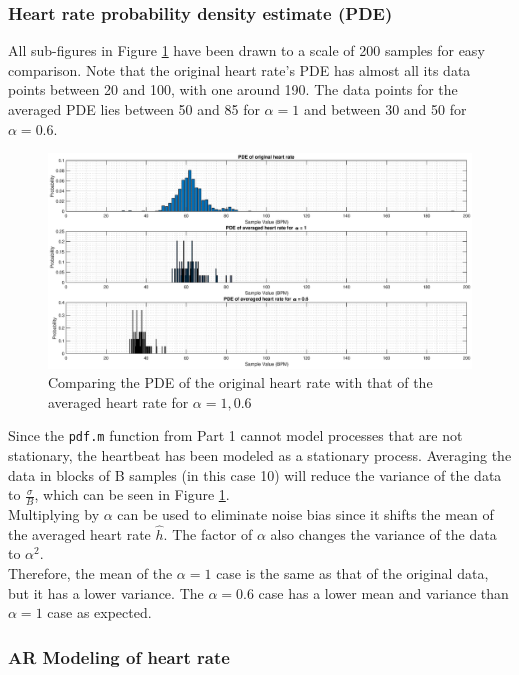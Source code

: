 \documentclass{article}
\begin{document}
\subsubsection{Heart rate probability density estimate (PDE)}

All sub-figures in Figure \ref{fig:heartrate_avg} have been drawn to a scale of 200 samples for easy comparison. Note that the original heart rate's PDE has almost all its data points between 20 and 100, with one around 190. The data points for the averaged PDE lies between 50 and 85 for $\alpha=1$ and between 30 and 50 for $\alpha=0.6$.

\begin{figure}[h!]
\centering
\includegraphics[width = \textwidth]{heartrate_avg}
\caption{Comparing the PDE of the original heart rate with that of the averaged heart rate for $\alpha=1,0.6$}
\label{fig:heartrate_avg}
\end{figure}

Since the \texttt{pdf.m} function from Part 1 cannot model processes that are not stationary, the heartbeat has been modeled as a stationary process. Averaging the data in blocks of B samples (in this case 10) will reduce the variance of the data to $\frac{\sigma}{B}$, which can be seen in Figure \ref{fig:heartrate_avg}.\\

Multiplying by $\alpha$ can be used to eliminate noise bias since it shifts the mean of the averaged heart rate $\hat{h}$. The factor of $\alpha$ also changes the variance of the data to $\alpha^2$.\\

Therefore, the mean of the $\alpha=1$ case is the same as that of the original data, but it has a lower variance. The $\alpha=0.6$ case has a lower mean and variance than $\alpha=1$ case as expected.

\subsubsection{AR Modeling of heart rate}
\end{document}
